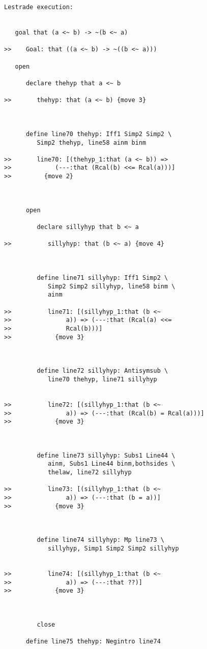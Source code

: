 \documentclass[12pt]{article}
\begin{document}
\begin{verbatim}Lestrade execution:


   goal that (a <~ b) -> ~(b <~ a)

>>    Goal: that ((a <~ b) -> ~((b <~ a)))

   open

      declare thehyp that a <~ b

>>       thehyp: that (a <~ b) {move 3}



      define line70 thehyp: Iff1 Simp2 Simp2 \
         Simp2 thehyp, line58 ainm binm

>>       line70: [(thehyp_1:that (a <~ b)) =>
>>            (---:that (Rcal(b) <<= Rcal(a)))]
>>         {move 2}



      open

         declare sillyhyp that b <~ a

>>          sillyhyp: that (b <~ a) {move 4}



         define line71 sillyhyp: Iff1 Simp2 \
            Simp2 Simp2 sillyhyp, line58 binm \
            ainm

>>          line71: [(sillyhyp_1:that (b <~
>>               a)) => (---:that (Rcal(a) <<=
>>               Rcal(b)))]
>>            {move 3}



         define line72 sillyhyp: Antisymsub \
            line70 thehyp, line71 sillyhyp


>>          line72: [(sillyhyp_1:that (b <~
>>               a)) => (---:that (Rcal(b) = Rcal(a)))]
>>            {move 3}



         define line73 sillyhyp: Subs1 Line44 \
            ainm, Subs1 Line44 binm,bothsides \
            thelaw, line72 sillyhyp

>>          line73: [(sillyhyp_1:that (b <~
>>               a)) => (---:that (b = a))]
>>            {move 3}



         define line74 sillyhyp: Mp line73 \
            sillyhyp, Simp1 Simp2 Simp2 sillyhyp


>>          line74: [(sillyhyp_1:that (b <~
>>               a)) => (---:that ??)]
>>            {move 3}



         close

      define line75 thehyp: Negintro line74



\end{verbatim}
\end{document}
